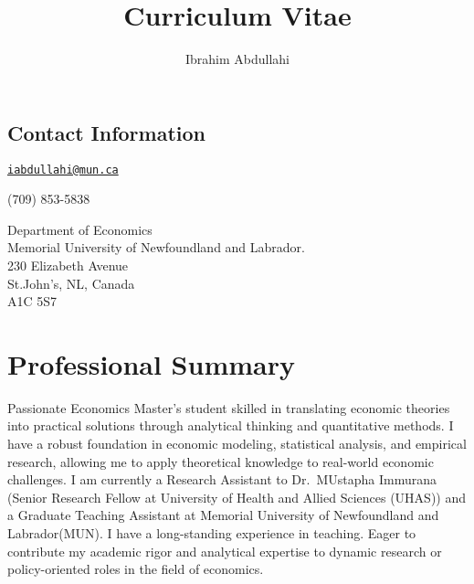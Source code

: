 \documentclass[
  letterpaper,
  DIV=11,
  numbers=noendperiod]{scrartcl}
\title{Curriculum Vitae}
\author{Ibrahim Abdullahi}
\date{}
\begin{document}
\maketitle
\ifdefined\Shaded\renewenvironment{Shaded}{\begin{tcolorbox}[interior hidden, borderline west={3pt}{0pt}{shadecolor}, boxrule=0pt, frame hidden, enhanced, sharp corners, breakable]}{\end{tcolorbox}}\fi

\hypertarget{contact-information}{%
\subsection{Contact Information}\label{contact-information}}

\href{mailto:iabdullahi@mun.ca}{\nolinkurl{iabdullahi@mun.ca}}

 (709) 853-5838

Department of Economics\\
\hspace*{0.333em}\hspace*{0.333em}\hspace*{0.333em}\hspace*{0.333em}
Memorial University of Newfoundland and Labrador.\\
\hspace*{0.333em}\hspace*{0.333em}\hspace*{0.333em}\hspace*{0.333em} 230
Elizabeth Avenue\\
\hspace*{0.333em}\hspace*{0.333em}\hspace*{0.333em}\hspace*{0.333em}
St.John's, NL, Canada\\
\hspace*{0.333em}\hspace*{0.333em}\hspace*{0.333em}\hspace*{0.333em} A1C
5S7

\hypertarget{professional-summary}{%
\section{Professional Summary}\label{professional-summary}}

Passionate Economics Master's student skilled in translating economic
theories into practical solutions through analytical thinking and
quantitative methods. I have a robust foundation in economic modeling,
statistical analysis, and empirical research, allowing me to apply
theoretical knowledge to real-world economic challenges. I am currently
a Research Assistant to Dr.~MUstapha Immurana (Senior Research Fellow at
University of Health and Allied Sciences (UHAS)) and a Graduate Teaching
Assistant at Memorial University of Newfoundland and Labrador(MUN). I
have a long-standing experience in teaching. Eager to contribute my
academic rigor and analytical expertise to dynamic research or
policy-oriented roles in the field of economics.
\end{document}
